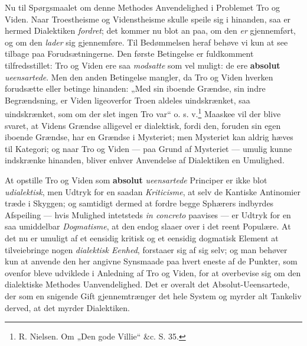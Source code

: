\documentclass[12pt,a4paper]{book}
\newcommand{\opage}[1]{\marginnote{\footnotesize\textit{[#1]}}}
\begin{document}
Nu til Spørgsmaalet om denne Methodes Anvendelighed i Problemet Tro og Viden. Naar Troestheisme
og Videnstheisme skulle speile sig i hinanden, saa er
hermed Dialektiken \emph{fordret}; det kommer nu blot an
paa, om den \emph{er} gjennemført, og om den \emph{lader} sig
gjennemføre. Til Bedømmelsen heraf behøve vi kun at
see tilbage paa Forudsætningerne. Den første Betingelse er fuldkomment tilfredsstillet: Tro og Viden ere
saa \emph{modsatte} som vel muligt: de ere \textbf{absolut} \emph{ueensartede}. Men den anden Betingelse mangler, da Tro
og Viden hverken forudsætte eller betinge hinanden: „Med
sin iboende Grændse, sin indre Begrændsning, er Viden
ligeoverfor Troen aldeles uindskrænket, saa uindskrænket,
som om der slet ingen Tro var“ o. s. v.\footnote{R. Nielsen. Om „Den gode Villie“ \&c. S. 35.} Maaskee
vil der blive svaret, at Videns Grændse alligevel er
dialektisk, fordi den, foruden sin egen iboende Grændse,
har en Grændse i Mysteriet; men Mysteriet kan aldrig
hæves til Kategori; og naar Tro og Viden --- paa
Grund af Mysteriet --- umulig kunne indskrænke hinanden, bliver enhver Anvendelse af Dialektiken en Umulighed.

At opstille Tro og Viden som \textbf{absolut} \emph{ueensartede} Principer er ikke blot \emph{udialektisk}, men Udtryk
for en saadan \emph{Kriticisme}, at selv de Kantiske Antinomier træde i Skyggen; og samtidigt dermed at fordre
begge Sphærers indbyrdes Afspeiling --- hvis Mulighed
\opage{92}\setcounter{footnote}{0}%
intetsteds \textit{in concreto} paavises --- er Udtryk for en saa
umiddelbar \emph{Dogmatisme}, at den endog slaaer over i
det reent Populære. At det nu er umuligt af et eensidig
kritisk og et eensidig dogmatisk Element at tilveiebringe
nogen \emph{dialektisk Eenhed}, forstaaer sig af sig selv;
og man behøver kun at anvende den her angivne Synsmaade paa hvert eneste af de Punkter, som ovenfor bleve
udviklede i Anledning af Tro og Viden, for at overbevise sig om den dialektiske Methodes Uanvendelighed.
Det er overalt det Absolut-Ueensartede, der som en
snigende Gift gjennemtrænger det hele System og myrder
alt Tankeliv derved, at det myrder Dialektiken.
\end{document}
